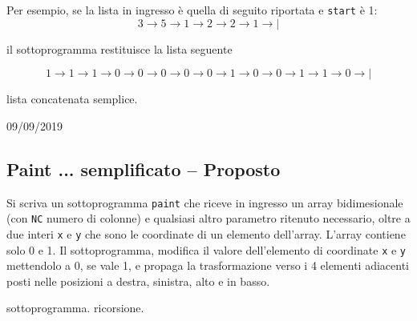 Per esempio, se la lista in ingresso \`e quella di seguito riportata e \texttt{start} \`e 1:
$$
3 \rightarrow 5 \rightarrow 1 \rightarrow 2  \rightarrow 2 \rightarrow 1 \rightarrow|
$$ 

il sottoprogramma restituisce la lista seguente

$$
1 \rightarrow 1 \rightarrow 1 \rightarrow 0 \rightarrow 0 \rightarrow 0 \rightarrow 0 \rightarrow 0 \rightarrow 1 \rightarrow 0 \rightarrow 0 \rightarrow 1 \rightarrow 1 \rightarrow 0 \rightarrow|
$$ 

\begin{tags}
lista concatenata semplice. 
\end{tags}

\begin{esame}
09/09/2019
\end{esame}



\prosep{}

\subsection{Paint ... semplificato -- Proposto}
Si scriva un sottoprogramma \texttt{paint} che riceve in ingresso un array bidimesionale (con \texttt{NC} numero di colonne) e qualsiasi altro parametro ritenuto necessario, oltre a due interi \texttt{x} e \texttt{y} che sono le coordinate di un elemento dell'array. L'array contiene solo 0 e 1. Il sottoprogramma, modifica il valore dell'elemento di coordinate \texttt{x} e \texttt{y} mettendolo a 0, se vale 1, e propaga la trasformazione verso i 4 elementi adiacenti posti nelle posizioni a destra, sinistra, alto e in basso.

\begin{tags}
sottoprogramma. ricorsione. 
\end{tags}

